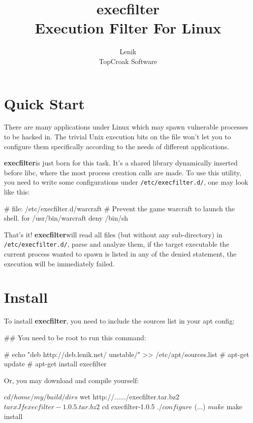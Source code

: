 \documentclass[hyperref, bookmark]{z-article}
\title {execfilter \\ Execution Filter For Linux }
\author{Lenik \\ \boDz TopCroak Software}
\newcommand\xfilt{\textbf{execfilter}}
\newcommand\configdir{\texttt{/etc/execfilter.d/}}
\begin{document}
\maketitle
\tableofcontents

\section {Quick Start}

There are many applications under Linux which may spawn vulnerable processes to
be hacked in.  The trivial Unix execution bits on the file won't let you to
configure them specifically according to the needs of different applications.


\xfilt is just born for this task. It's a shared library dynamically inserted
before libc, where the most process creation calls are made.  To use this
utility, you need to write some configurations under \configdir, one may look
like this:

\begin{codeblk}
  # file: /etc/execfilter.d/warcraft
  # Prevent the game warcraft to launch the shell.
  for /usr/bin/warcraft
      deny /bin/sh
\end{codeblk}

That's it! \xfilt will read all files (but without any sub-directory) in
\configdir, parse and analyze them, if the target executable the current process
wanted to spawn is listed in any of the denied statement, the execution will be
immediately failed.

\section {Install}

To install \xfilt, you need to include the \boDz sources list in your apt
config:

\begin{console}
  ## You need to be root to run this command:

  # echo "deb http://deb.lenik.net/ unstable/" >> /etc/apt/sources.list
  # apt-get update
  # apt-get install execfilter
\end{console}

Or, you may download and compile yourself:

\begin{console}
  $ cd /home/my/build/dirs
  $ wet http://....../execfilter.tar.bz2
  $ tar xJf execfilter-1.0.5.tar.bz2
  $ cd execfilter-1.0.5
  $ ./configure
  $  (...)
  $ make
  $ make install
\end{console}
\end{document}
